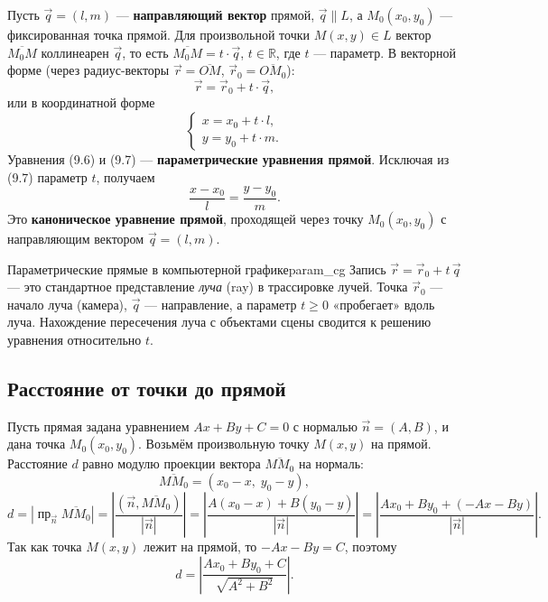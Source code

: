 \documentclass[12pt,a4paper]{article}
\begin{document}
Пусть $\vec{q} = (l, m)$ — \textbf{направляющий вектор} прямой,
$\vec{q} \parallel L$, а $M_0(x_0, y_0)$ — фиксированная точка прямой. Для
произвольной точки $M(x, y) \in L$ вектор $\overline{M_0 M}$ коллинеарен
$\vec{q}$, то есть $\overline{M_0 M} = t \cdot \vec{q}$, $t \in \mathbb{R}$,
где $t$ — параметр. В векторной форме (через радиус-векторы
$\vec{r} = \overline{OM}$, $\vec{r}_0 = \overline{OM_0}$):
\begin{equation}
  \vec{r} = \vec{r}_0 + t \cdot \vec{q}, \tag{9.6}
\end{equation}
или в координатной форме
\begin{equation}
  \begin{cases}
    x = x_0 + t \cdot l, \\
    y = y_0 + t \cdot m.
  \end{cases} \tag{9.7}
\end{equation}
Уравнения (9.6) и (9.7) — \textbf{параметрические уравнения прямой}.
Исключая из (9.7) параметр $t$, получаем
\begin{equation}
  \frac{x - x_0}{l} = \frac{y - y_0}{m}. \tag{9.8}
\end{equation}
Это \textbf{каноническое уравнение прямой}, проходящей через точку
$M_0(x_0, y_0)$ с направляющим вектором $\vec{q} = (l, m)$.

\begin{remarkIT}{Параметрические прямые в компьютерной графике}{param_cg}
  Запись $\vec{r} = \vec{r}_0 + t\,\vec{q}$ — это стандартное представление
  \emph{луча} (ray) в трассировке лучей. Точка $\vec{r}_0$ — начало луча
  (камера), $\vec{q}$ — направление, а параметр $t \geq 0$ «пробегает»
  вдоль луча. Нахождение пересечения луча с объектами сцены сводится к
  решению уравнения относительно $t$.
\end{remarkIT}

\subsection*{Расстояние от точки до прямой}

Пусть прямая задана уравнением $Ax + By + C = 0$ с нормалью
$\vec{n} = (A, B)$, и дана точка $M_0(x_0, y_0)$. Возьмём произвольную точку
$M(x, y)$ на прямой. Расстояние $d$ равно модулю проекции вектора
$\overline{M M_0}$ на нормаль:
\[
  \overline{M M_0} = (x_0 - x,\; y_0 - y),
\]
\[
  d = \left| \operatorname{пр}_{\vec{n}} \overline{M M_0} \right|
  = \left| \frac{(\vec{n}, \overline{M M_0})}{|\vec{n}|} \right|
  = \left| \frac{A(x_0 - x) + B(y_0 - y)}{|\vec{n}|} \right|
  = \left| \frac{Ax_0 + By_0 + (-Ax - By)}{|\vec{n}|} \right|.
\]
Так как точка $M(x,y)$ лежит на прямой, то $-Ax - By = C$, поэтому
\begin{equation}
  d = \left| \frac{Ax_0 + By_0 + C}{\sqrt{A^2 + B^2}} \right|. \tag{9.9}
\end{equation}
\end{document}
